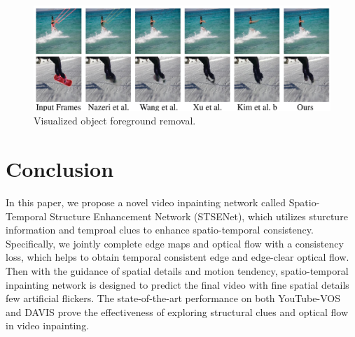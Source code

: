 \begin{figure}[t]
	\centering
	\includegraphics[width=1.0\columnwidth]{vis_forg} %
	\caption{Visualized object foreground removal.}
	\label{vis_forg}
\end{figure}



\section{Conclusion}
In this paper, we propose a novel video inpainting network called Spatio-Temporal Structure Enhancement Network (STSENet), which utilizes sturcture information and temproal clues to enhance spatio-temporal consistency. Specifically, we jointly complete edge maps and optical flow with a consistency loss, which helps to obtain temporal consistent edge and edge-clear optical flow. Then with the guidance of spatial details and motion tendency, spatio-temporal inpainting network is designed to predict the final video with fine spatial details few artificial flickers.
The state-of-the-art performance on both YouTube-VOS and DAVIS prove the effectiveness of exploring structural clues and optical flow in video inpainting.
 
